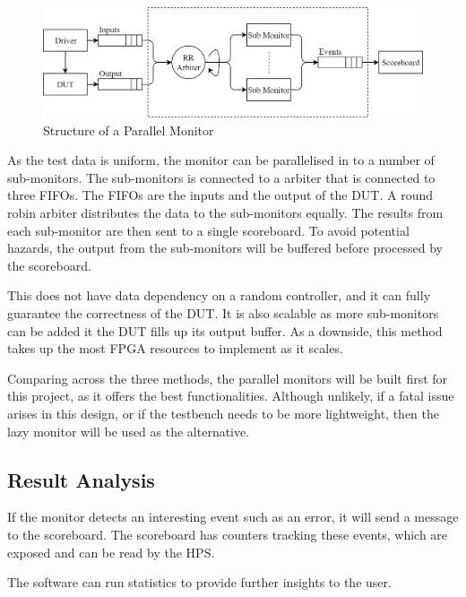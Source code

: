 \begin{figure}[H]
  \centering
  \includegraphics[width=15cm]{img/ParMon}
  \caption{Structure of a Parallel Monitor}
  \label{ParMon}
\end{figure}

As the test data is uniform, the monitor can be parallelised in to a number of
sub-monitors.
The sub-monitors is connected to a arbiter that is connected to three FIFOs.
The FIFOs are the inputs and the output of the DUT.
A round robin arbiter distributes the data to the sub-monitors equally.
The results from each sub-monitor are then sent to a single scoreboard.
To avoid potential hazards, the output from the sub-monitors will be buffered
before processed by the scoreboard.

This does not have data dependency on a random controller, and it can
fully guarantee the correctness of the DUT.
It is also scalable as more sub-monitors can be added it the DUT fills up its
output buffer.
As a downside, this method takes up the most FPGA resources to implement as it
scales.

Comparing across the three methods, the parallel monitors will be built first
for this project, as it offers the best functionalities.
Although unlikely, if a fatal issue arises in this design, or if the testbench
needs to be more lightweight, then the lazy monitor will be used as the
alternative.

\subsection{Result Analysis}
If the monitor detects an interesting event such as an error, it will send
a message to the scoreboard.
The scoreboard has counters tracking these events, which are exposed and can be
read by the HPS.

The software can run statistics to provide further insights to the user.